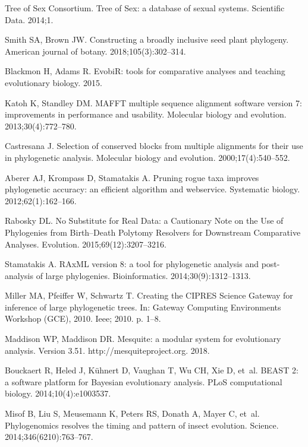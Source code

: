 \documentclass[]{rsos}%
\begin{document}
\begin{thebibliography}{99}
{Tree of Sex Consortium}.
 Tree of Sex: a database of sexual systems.
 Scientific Data. 2014;1.

Smith SA, Brown JW.
 Constructing a broadly inclusive seed plant phylogeny.
 American journal of botany. 2018;105(3):302--314.

Blackmon H, Adams R. EvobiR: tools for comparative analyses and teaching
  evolutionary biology. 2015.

Katoh K, Standley DM.
 MAFFT multiple sequence alignment software version 7: improvements in
  performance and usability.
 Molecular biology and evolution. 2013;30(4):772--780.

Castresana J.
 Selection of conserved blocks from multiple alignments for their use
  in phylogenetic analysis.
 Molecular biology and evolution. 2000;17(4):540--552.

Aberer AJ, Krompass D, Stamatakis A.
 Pruning rogue taxa improves phylogenetic accuracy: an efficient
  algorithm and webservice.
 Systematic biology. 2012;62(1):162--166.

Rabosky DL.
 No Substitute for Real Data: a Cautionary Note on the Use of
  Phylogenies from Birth--Death Polytomy Resolvers for Downstream Comparative
  Analyses.
 Evolution. 2015;69(12):3207--3216.

Stamatakis A.
 RAxML version 8: a tool for phylogenetic analysis and post-analysis
  of large phylogenies.
 Bioinformatics. 2014;30(9):1312--1313.

Miller MA, Pfeiffer W, Schwartz T.
 Creating the CIPRES Science Gateway for inference of large
  phylogenetic trees.
 In: Gateway Computing Environments Workshop (GCE), 2010. Ieee; 2010.
  p. 1--8.

Maddison WP, Maddison DR.
 Mesquite: a modular system for evolutionary analysis. Version 3.51.
 http://mesquiteproject.org. 2018.

Bouckaert R, Heled J, K{\"u}hnert D, Vaughan T, Wu CH, Xie D, et~al.
 BEAST 2: a software platform for Bayesian evolutionary analysis.
 PLoS computational biology. 2014;10(4):e1003537.

Misof B, Liu S, Meusemann K, Peters RS, Donath A, Mayer C, et~al.
 Phylogenomics resolves the timing and pattern of insect evolution.
 Science. 2014;346(6210):763--767.


\end{thebibliography}
\end{document}
